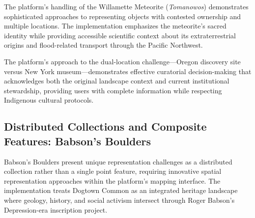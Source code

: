 The platform's handling of the Willamette Meteorite (\emph{Tomanowos}) demonstrates sophisticated approaches to representing objects with contested ownership and multiple locations. The implementation emphasizes the meteorite's sacred identity while providing accessible scientific context about its extraterrestrial origins and flood-related transport through the Pacific Northwest.


The platform's approach to the dual-location challenge—Oregon discovery site versus New York museum—demonstrates effective curatorial decision-making that acknowledges both the original landscape context and current institutional stewardship, providing users with complete information while respecting Indigenous cultural protocols.

\subsection{Distributed Collections and Composite Features: Babson's Boulders}
\label{subsec:distributed_collections}

Babson's Boulders present unique representation challenges as a distributed collection rather than a single point feature, requiring innovative spatial representation approaches within the platform's mapping interface. The implementation treats Dogtown Common as an integrated heritage landscape where geology, history, and social activism intersect through Roger Babson's Depression-era inscription project.


